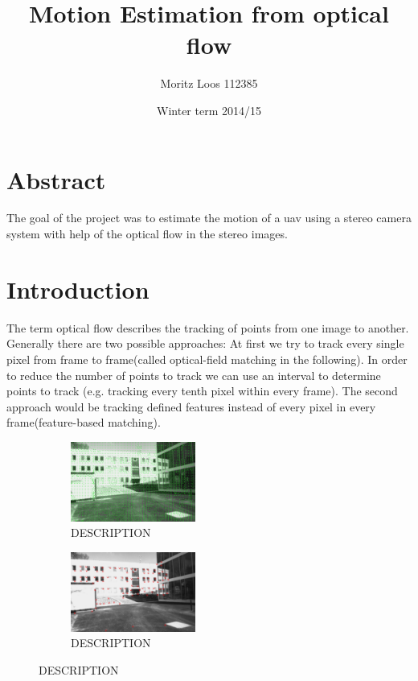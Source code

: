\documentclass[11pt]{article}
\title{\textbf{Motion Estimation from optical flow}}
\author{ Moritz Loos 112385 }
\date{ Winter term 2014/15 }
\begin{document}
	
	\maketitle

	\section{Abstract}
	The goal of the project was to estimate the motion of a uav using a stereo camera system with help of the optical flow in the stereo images.

	\section{Introduction}
	The term optical flow describes the tracking of points from one image to another. Generally there are two possible approaches:
	At first we try to track every single pixel from frame to frame(called optical-field matching in the  following). In order to reduce the number of points to track we can use an interval to determine points to track (e.g. tracking every tenth pixel within every frame). The second approach would be tracking defined features instead of every pixel in every frame(feature-based matching).
	
	\begin{figure}[H]
	        \centering
	        \begin{subfigure}[b]{0.45\textwidth}
	                \includegraphics[width=0.45\textwidth]{images/farneback.jpg}
	                \caption{DESCRIPTION}
	                \label{fig:optical-field-matching}
	        \end{subfigure}\hfill 
	        \begin{subfigure}[b]{0.45\textwidth}
	                \includegraphics[width=0.45\textwidth]{images/feature-based-matching.jpg}
	                \caption{DESCRIPTION}
	                \label{fig:feature-based-matching}
	        \end{subfigure}
	\end{figure}
	
\end{document}
